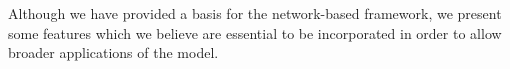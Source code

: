 
Although we have provided a basis for the network-based framework, we present some features which we believe are essential to be incorporated in order to allow broader applications of the model.


% 









